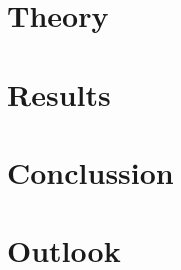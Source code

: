\documentclass[12pt, oneside]{book}
\begin{document}

\chapter{Theory}
\label{chap:theo}



\chapter{Results}
\label{chap:res}



\chapter{Conclussion}
\label{chap:con}


\chapter{Outlook}
\label{chap:out}









\appendix
\renewcommand{\thesection}{A\arabic{section}}

\end{document}
